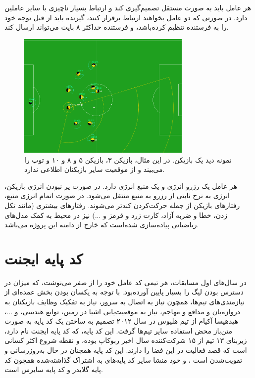 هر عامل باید به صورت مستقل تصمیم‌گیری کند و ارتباط بسیار ناچیزی با سایر عاملین دارد.
در صورتی که دو عامل بخواهند ارتباط برقرار کنند، گیرنده باید از قبل توجه خود را به فرستنده تنظیم کرده‌باشد، و فرستنده حداکثر ۸ بایت می‌تواند ارسال کند.

\begin{figure}[H]
\centering
\includegraphics[width=0.75\textwidth]{images/view.png}
\caption{نمونه دید یک بازیکن. در این مثال، بازیکن ۳، بازیکن ۵ و ۸ و ۱۰ و توپ را می‌بیند و از موقعیت سایر بازیکنان اطلاعی ندارد.}\label{fig:view}
    
\end{figure}

هر عامل یک رزرو انرژی و یک منبع انرژی دارد. در صورت پر نبودن انرژی بازیکن، انرژی به نرخ ثابتی از رزرو به منبع منتقل می‌شود.
در صورت اتمام انرژی منبع، رفتار‌های بازیکن از جمله حرکت‌کردن کند‌تر می‌شوند.
رفتار‌های بیشتری (مانند تکل زدن، خطا و ضربه‌ آزاد، کارت زرد و قرمز و ...) 
نیز در محیط به کمک مدل‌های ریاضیاتی پیاده‌سازی شده‌است که خارج از دامنه این پروژه می‌باشد.

\section{کد پایه ایجنت}
در سال‌های اول مسابقات، هر تیمی کد عامل خود را از صفر می‌نوشت، که میزان در دسترس بودن لیگ را بسیار پایین آورده‌بود. با توجه به یکسان بودن بخش عمده‌ای از نیازمندی‌های تیم‌ها،
همچون نیاز به اتصال به سرور، نیاز به تفکیک وظایف بازیکنان به دروازه‌بان و مدافع و مهاجم، نیاز به موقعیت‌یابی اشیا در زمین، توابع هندسی، و ...، هیدهیسا آکیام از تیم هلیوس در سال ۲۰۱۲ تصمیم به ساختن یک کد پایه به صورت متن‌باز محض استفاده سایر تیم‌ها گرفت.
این کد پایه، که کد پایه ایجنت نام دارد، زیربنای ۱۳ تیم از ۱۵ شرکت‌کننده سال اخیر ربوکاپ بوده، و نقطه شروع اکثر کسانی است که قصد فعالیت در این فضا را دارند.
این کد پایه همچنان در حال به‌روز‌رسانی و تقویت‌شدن است
، و خود منشا سایر کد پایه‌های به اشتراک گذاشته‌شده همچون کد پایه گلایدر و کد پایه سایرس است.

